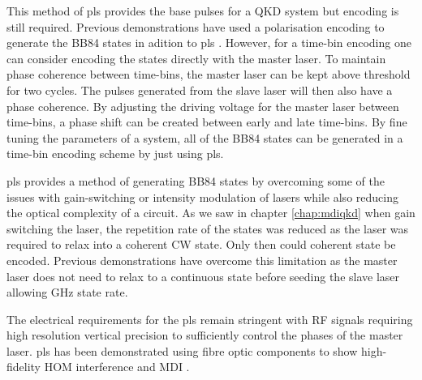 This method of \ac{pls} provides the base pulses for a \ac{QKD} system but encoding is still required. Previous demonstrations have used a polarisation encoding to generate the BB84 states in adition to \ac{pls} \cite{Comandar2016}. However, for a time-bin encoding one can consider encoding the states directly with the master laser. To maintain phase coherence between time-bins, the master laser can be kept above threshold for two cycles. The pulses generated from the slave laser will then also have a phase coherence. By adjusting the driving voltage for the master laser between time-bins, a phase shift can be created between early and late time-bins. By fine tuning the parameters of a system, all of the BB84 states can be generated in a time-bin encoding scheme by just using \ac{pls}.

\Ac{pls} provides a method of generating BB84 states by overcoming some of the issues with gain-switching or intensity modulation of lasers while also reducing the optical complexity of a circuit. As we saw in chapter \ref{chap:mdiqkd} when gain switching the laser, the repetition rate of the states was reduced as the laser was required to relax into a coherent \ac{CW} state. Only then could coherent state be encoded. Previous demonstrations \cite{Comandar2016PLS, Comandar2016} have overcome this limitation as the master laser does not need to relax to a continuous state before seeding the slave laser allowing GHz state rate. 

The electrical requirements for the \ac{pls} remain stringent with RF signals requiring high resolution vertical precision to sufficiently control the phases of the master laser. \Ac{pls} has been demonstrated using fibre optic components to show high-fidelity \ac{HOM} interference and \ac{MDI} \cite{Comandar2016PLS, Comandar2016}. 


